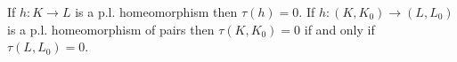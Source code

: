 If $h: K \rightarrow L$ is a p.l. homeomorphism then $\tau(h) = 0$. If $h: (K, K_0) \rightarrow (L, L_0)$ is a p.l. homeomorphism of pairs then $\tau(K, K_0) = 0$ if and only if $\tau(L, L_0) = 0$.
